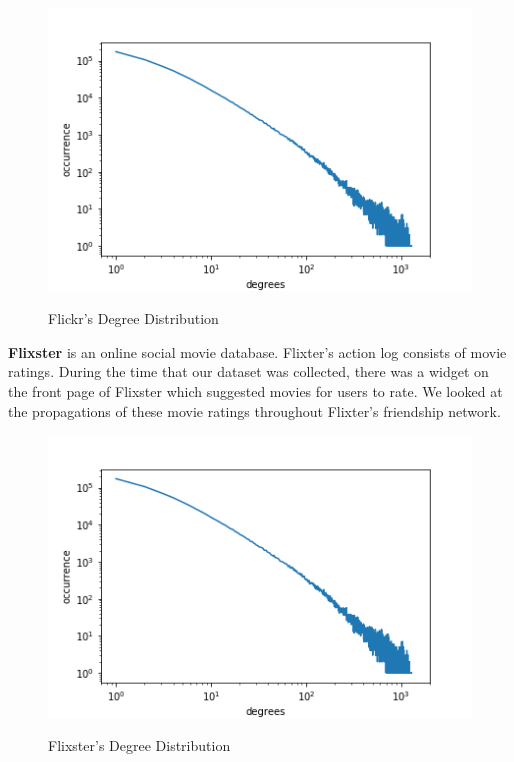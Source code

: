 \documentclass{acm_proc_article-sp}
\begin{document}
\begin{figure}[h]
	\includegraphics[width=\linewidth]{degree-flixster.png}
	\centering
	\label{degree-flixster}
	\caption{Flickr's Degree Distribution}
\end{figure}

\textbf{Flixster} \cite{data:flixster} is an online social movie database. Flixter's action log consists of movie ratings. During the time that our dataset was collected, there was a widget on the front page of Flixster which suggested movies for users to rate. We looked at the propagations of these movie ratings throughout Flixter's friendship network. \cite{data:flixsterpaper}

\begin{figure}[h]
	\includegraphics[width=\linewidth]{degree-flixster.png}
	\centering
	\label{degree-flixster}
	\caption{Flixster's Degree Distribution}
\end{figure}
\end{document}
